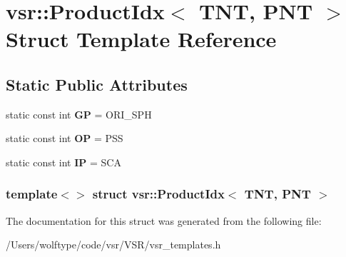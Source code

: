 \hypertarget{structvsr_1_1_product_idx_3_01_t_n_t_00_01_p_n_t_01_4}{\section{vsr\-:\-:Product\-Idx$<$ T\-N\-T, P\-N\-T $>$ Struct Template Reference}
\label{structvsr_1_1_product_idx_3_01_t_n_t_00_01_p_n_t_01_4}
}
\subsection*{Static Public Attributes}
\begin{DoxyCompactItemize}
\item 
\hypertarget{structvsr_1_1_product_idx_3_01_t_n_t_00_01_p_n_t_01_4_a902872e1de7de81ccdd1d33978fe0a9a}{static const int {\bfseries G\-P} = O\-R\-I\-\_\-\-S\-P\-H}\label{structvsr_1_1_product_idx_3_01_t_n_t_00_01_p_n_t_01_4_a902872e1de7de81ccdd1d33978fe0a9a}

\item 
\hypertarget{structvsr_1_1_product_idx_3_01_t_n_t_00_01_p_n_t_01_4_a3ccbf8cda149093820599161cdc3344b}{static const int {\bfseries O\-P} = P\-S\-S}\label{structvsr_1_1_product_idx_3_01_t_n_t_00_01_p_n_t_01_4_a3ccbf8cda149093820599161cdc3344b}

\item 
\hypertarget{structvsr_1_1_product_idx_3_01_t_n_t_00_01_p_n_t_01_4_a4d7209981554bfa7f345b05be0c1e6e4}{static const int {\bfseries I\-P} = S\-C\-A}\label{structvsr_1_1_product_idx_3_01_t_n_t_00_01_p_n_t_01_4_a4d7209981554bfa7f345b05be0c1e6e4}

\end{DoxyCompactItemize}
\subsubsection*{template$<$$>$ struct vsr\-::\-Product\-Idx$<$ T\-N\-T, P\-N\-T $>$}



The documentation for this struct was generated from the following file\-:\begin{DoxyCompactItemize}
\item 
/\-Users/wolftype/code/vsr/\-V\-S\-R/vsr\-\_\-templates.\-h\end{DoxyCompactItemize}
